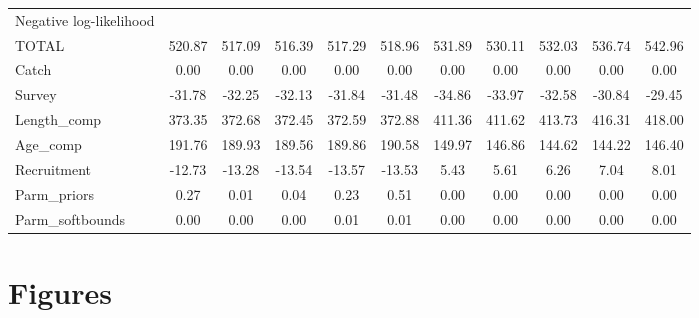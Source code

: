 \documentclass[12pt,]{article}
\begin{document}
\begin{landscape}
\begin{table}[ht]
\begin{tabular}{l|ccccc|ccccc}
  Negative log-likelihood &  &  &  &  &  &  &  &  &  &  \\ 
  TOTAL & 520.87 & 517.09 & 516.39 & 517.29 & 518.96 & 531.89 & 530.11 & 532.03 & 536.74 & 542.96 \\ 
  Catch & 0.00 & 0.00 & 0.00 & 0.00 & 0.00 & 0.00 & 0.00 & 0.00 & 0.00 & 0.00 \\ 
  Survey & -31.78 & -32.25 & -32.13 & -31.84 & -31.48 & -34.86 & -33.97 & -32.58 & -30.84 & -29.45 \\ 
  Length\_comp & 373.35 & 372.68 & 372.45 & 372.59 & 372.88 & 411.36 & 411.62 & 413.73 & 416.31 & 418.00 \\ 
  Age\_comp & 191.76 & 189.93 & 189.56 & 189.86 & 190.58 & 149.97 & 146.86 & 144.62 & 144.22 & 146.40 \\ 
  Recruitment & -12.73 & -13.28 & -13.54 & -13.57 & -13.53 & 5.43 & 5.61 & 6.26 & 7.04 & 8.01 \\ 
  Parm\_priors & 0.27 & 0.01 & 0.04 & 0.23 & 0.51 & 0.00 & 0.00 & 0.00 & 0.00 & 0.00 \\ 
  Parm\_softbounds & 0.00 & 0.00 & 0.00 & 0.01 & 0.01 & 0.00 & 0.00 & 0.00 & 0.00 & 0.00 \\ 
   \hline
\end{tabular}
\end{table}

\end{landscape}

\FloatBarrier

\newpage

\newpage

\FloatBarrier

\FloatBarrier

\newpage

\section{Figures}\label{figures}
\end{document}
